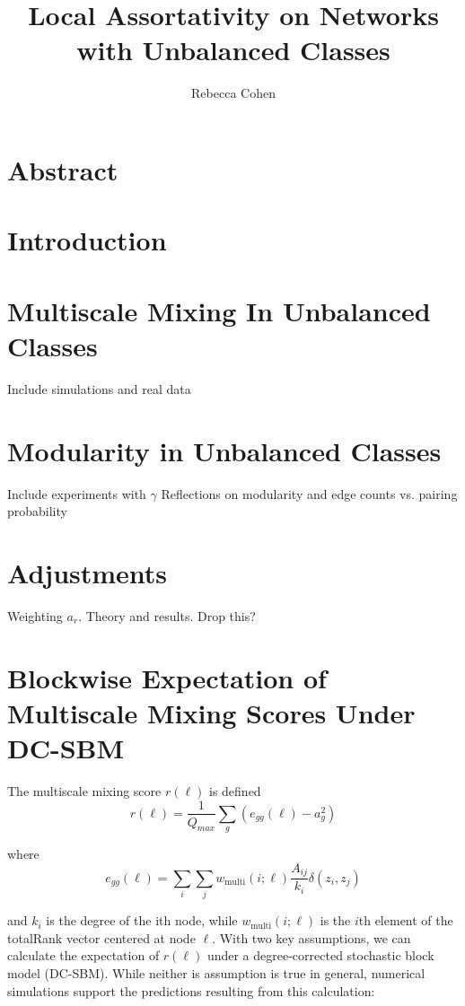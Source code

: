 \documentclass[12pt]{article}
\title{Local Assortativity on Networks with Unbalanced Classes}
\author{Rebecca Cohen}
\begin{document}
\maketitle
\section{Abstract}
\section{Introduction}

\section{Multiscale Mixing In Unbalanced Classes}
Include simulations and real data

\section{Modularity in Unbalanced Classes}
Include experiments with $\gamma$
Reflections on modularity and edge counts vs. pairing probability

\section{Adjustments}
Weighting $a_r$.  Theory and results.  Drop this?

\section{Blockwise Expectation of Multiscale Mixing Scores Under DC-SBM}
The multiscale mixing score $r(\ell)$ is defined
\begin{equation}
  r(\ell) = \frac{1}{Q_{max}} \sum_g (e_{gg}(\ell) - a_g^2)
\end{equation}

where 
\begin{equation}
  e_{gg}(\ell) = \sum_i \sum_j w_{\text{multi}}(i; \ell) \frac{A_{ij}}{k_i} \delta(z_i, z_j) 
\end{equation}

and $k_i$ is the degree of the ith node, while $w_{\text{multi}}(i; \ell)$ is the $i$th element of the totalRank vector centered at node $\ell$.  With two key assumptions, we can calculate the expectation of $r(\ell)$ under a degree-corrected stochastic block model (DC-SBM).  While neither is assumption is true in general, numerical simulations support the predictions resulting from this calculation:
\end{document}
